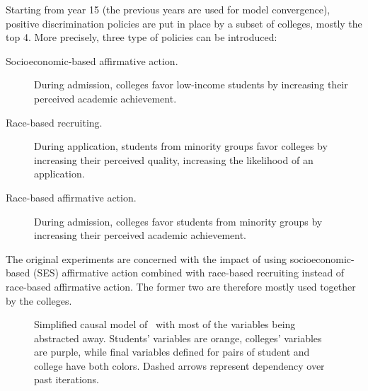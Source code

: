 Starting from year 15 (the previous years are used for model
convergence), positive discrimination policies are put in place by a subset of colleges, mostly the top 4.
More precisely, three type of policies can be introduced:

\begin{description}

\item[Socioeconomic-based affirmative action.] During admission, colleges favor low-income students by increasing their perceived academic achievement.

\item[Race-based recruiting.] During application, students from minority groups favor colleges by increasing their perceived quality, increasing the likelihood of an application.

\item[Race-based affirmative action.] During admission, colleges favor students from minority groups by increasing their perceived academic achievement.

\end{description}

The original experiments are concerned with the impact of using socioeconomic-based (SES) affirmative action combined with race-based recruiting instead of race-based affirmative action. The former two are therefore mostly used together by the colleges.

\begin{figure}[ht]
  \centering
  \caption{Simplified causal model of~\cite{reardon2018levels} with most of the variables being abstracted away.
Students' variables are \colorbox{PuOr-K}{orange}, colleges' variables are \colorbox{PuOr-E}{purple}, while final variables defined for pairs of student and college have both colors.
Dashed arrows represent dependency over past iterations.}
  \label{fig:model}
\end{figure}

